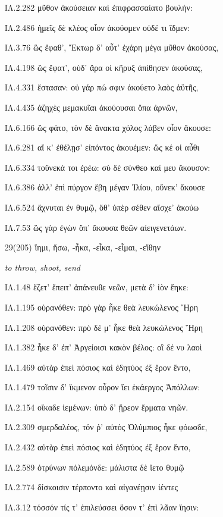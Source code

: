\begin{enumerate}
{ΙΛ.2.282 μῦθον ἀκούσειαν καὶ ἐπιφρασσαίατο βουλήν:

ΙΛ.2.486 ἡμεῖς δὲ κλέος οἶον ἀκούομεν οὐδέ τι ἴδμεν:

ΙΛ.3.76 ὣς ἔφαθ', Ἕκτωρ δ' αὖτ' ἐχάρη μέγα μῦθον ἀκούσας,

ΙΛ.4.198 ὣς ἔφατ', οὐδ' ἄρα οἱ κῆρυξ ἀπίθησεν ἀκούσας,

ΙΛ.4.331 ἕστασαν: οὐ γάρ πώ σφιν ἀκούετο λαὸς ἀϋτῆς,

ΙΛ.4.435 ἀζηχὲς μεμακυῖαι ἀκούουσαι ὄπα ἀρνῶν,

ΙΛ.6.166 ὣς φάτο, τὸν δὲ ἄνακτα χόλος λάβεν οἷον ἄκουσε:

ΙΛ.6.281 αἴ κ' ἐθέλῃσ' εἰπόντος ἀκουέμεν: ὥς κέ οἱ αὖθι

ΙΛ.6.334 τοὔνεκά τοι ἐρέω: σὺ δὲ σύνθεο καί μευ ἄκουσον:

ΙΛ.6.386 ἀλλ' ἐπὶ πύργον ἔβη μέγαν Ἰλίου, οὕνεκ' ἄκουσε

ΙΛ.6.524 ἄχνυται ἐν θυμῷ, ὅθ' ὑπὲρ σέθεν αἴσχε' ἀκούω

ΙΛ.7.53 ὣς γὰρ ἐγὼν ὄπ' ἄκουσα θεῶν αἰειγενετάων.

}

\clearpage
\item[\large 29(205)]{\large \g  ἵημι, ἥσω, -ἧκα, -εἷκα, -εἷμαι, -εἵθην  }

\hspace{0.2cm} \textit{to throw, shoot, send  }

{\g
ΙΛ.1.48 ἕζετ' ἔπειτ' ἀπάνευθε νεῶν, μετὰ δ' ἰὸν ἕηκε: 

ΙΛ.1.195 οὐρανόθεν: πρὸ γὰρ ἧκε θεὰ λευκώλενος Ἥρη

ΙΛ.1.208 οὐρανόθεν: πρὸ δέ μ' ἧκε θεὰ λευκώλενος Ἥρη

ΙΛ.1.382 ἧκε δ' ἐπ' Ἀργείοισι κακὸν βέλος: οἳ δέ νυ λαοὶ

ΙΛ.1.469 αὐτὰρ ἐπεὶ πόσιος καὶ ἐδητύος ἐξ ἔρον ἕντο,

ΙΛ.1.479 τοῖσιν δ' ἴκμενον οὖρον ἵει ἑκάεργος Ἀπόλλων:

ΙΛ.2.154 οἴκαδε ἱεμένων: ὑπὸ δ' ᾕρεον ἕρματα νηῶν.

ΙΛ.2.309 σμερδαλέος, τόν ῥ' αὐτὸς Ὀλύμπιος ἧκε φόωσδε,

ΙΛ.2.432 αὐτὰρ ἐπεὶ πόσιος καὶ ἐδητύος ἐξ ἔρον ἕντο,

ΙΛ.2.589 ὀτρύνων πόλεμόνδε: μάλιστα δὲ ἵετο θυμῷ

ΙΛ.2.774 δίσκοισιν τέρποντο καὶ αἰγανέῃσιν ἱέντες

ΙΛ.3.12 τόσσόν τίς τ' ἐπιλεύσσει ὅσον τ' ἐπὶ λᾶαν ἵησιν:

}
\end{enumerate}
